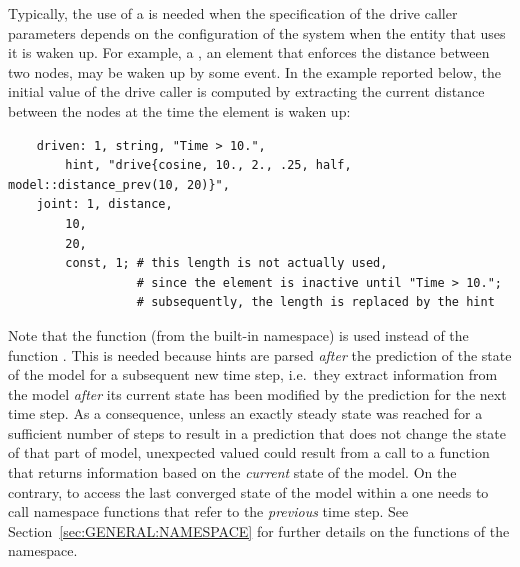 Typically, the use of a  is needed when the specification of the
drive caller parameters depends on the configuration of the system when the
entity that uses it is waken up.
For example, a , an element that enforces the distance
between two nodes, may be waken up by some event.
In the example reported below, the initial value of the  drive caller
is computed by extracting the current distance between the nodes at the time
the element is waken up:
\begin{verbatim}
    driven: 1, string, "Time > 10.",
        hint, "drive{cosine, 10., 2., .25, half, model::distance_prev(10, 20)}",
    joint: 1, distance,
        10,
        20,
        const, 1; # this length is not actually used,
                  # since the element is inactive until "Time > 10.";
                  # subsequently, the length is replaced by the hint
\end{verbatim}
Note that the function 
(from the built-in  namespace)
is used instead of the function .
This is needed because hints are parsed \emph{after} the prediction
of the state of the model for a subsequent new time step,
i.e.\ they extract information from the model
\emph{after} its current state has been modified by the prediction
for the next time step.
As a consequence, unless an exactly steady state was reached
for a sufficient number of steps to result in a prediction
that does not change the state of that part of model,
unexpected valued could result from a call to a function that returns
information based on the \emph{current} state of the model.
On the contrary, to access the last converged state of the model
within a  one needs to call  namespace functions
that refer to the \emph{previous} time step.
See Section~\ref{sec:GENERAL:NAMESPACE} for further details
on the functions of the  namespace.



